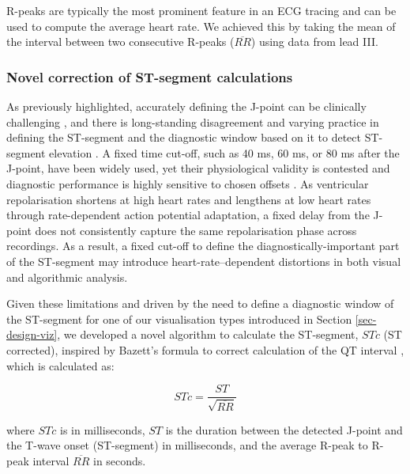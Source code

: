 \documentclass[
  10pt,
  letterpaper,
]{article}
\begin{document}
R-peaks are typically the most prominent feature in an ECG tracing and
can be used to compute the average heart rate. We achieved this by
taking the mean of the interval between two consecutive R-peaks
(\(\overline{RR}\)) using data from lead III.

\subsubsection{Novel correction of ST-segment
calculations}\label{novel-correction-of-st-segment-calculations}

As previously highlighted, accurately defining the J-point can be
clinically challenging \cite{carley_2002}, and there is long-standing
disagreement and varying practice in defining the ST-segment and the
diagnostic window based on it to detect ST-segment elevation
\cite{man_2017}. A fixed time cut-off, such as 40 ms, 60 ms, or 80 ms
after the J-point, have been widely used, yet their physiological
validity is contested and diagnostic performance is highly sensitive to
chosen offsets \cite{lindow_2020}. As ventricular repolarisation
shortens at high heart rates and lengthens at low heart rates through
rate-dependent action potential adaptation, a fixed delay from the
J-point does not consistently capture the same repolarisation phase
across recordings. As a result, a fixed cut-off to define the
diagnostically-important part of the ST-segment may introduce
heart-rate--dependent distortions in both visual and algorithmic
analysis.

Given these limitations and driven by the need to define a diagnostic
window of the ST-segment for one of our visualisation types introduced
in Section \ref{sec-design-viz}, we developed a novel algorithm to
calculate the ST-segment, \(STc\) (ST corrected), inspired by Bazett's
formula to correct calculation of the QT interval \citep{bazett}, which
is calculated as:

\begin{equation*}
STc = \frac{ST}{\sqrt{\overline{RR}}}
\end{equation*}

where \(STc\) is in milliseconds, \(ST\) is the duration between the
detected J-point and the T-wave onset (ST-segment) in milliseconds, and
the average R-peak to R-peak interval \(\overline{RR}\) in seconds.
\end{document}
